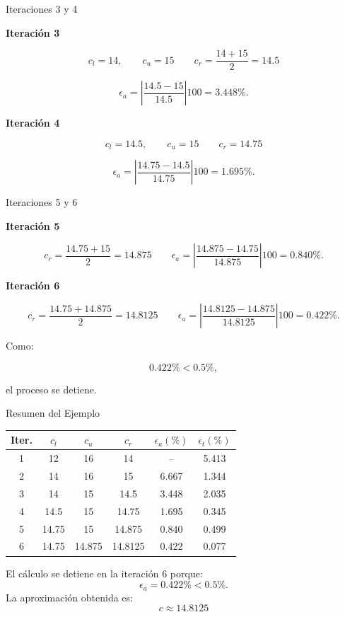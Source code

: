\documentclass[../../main.tex]{subfiles}
\begin{document}

\begin{frame}{Iteraciones 3 y 4}

\textbf{Iteración 3}

\[
c_l=14,
\qquad
c_u=15
\qquad
c_r=
\frac{14+15}{2}
=14.5
\]

\[
\epsilon_a
=
\left|
\frac{14.5-15}{14.5}
\right|
100
=
3.448\%.
\]

\textbf{Iteración 4}

\[
c_l=14.5,
\qquad
c_u=15
\qquad
c_r=
14.75
\]

\[
\epsilon_a
=
\left|
\frac{14.75-14.5}{14.75}
\right|
100
=
1.695\%.
\]

\end{frame}



\begin{frame}{Iteraciones 5 y 6}

\textbf{Iteración 5}

\[
c_r=
\frac{14.75+15}{2}
=
14.875
\qquad
\epsilon_a
=
\left|
\frac{14.875-14.75}{14.875}
\right|
100
=
0.840\%.
\]


\textbf{Iteración 6}

\[
c_r=
\frac{14.75+14.875}{2}
=
14.8125
\qquad
\epsilon_a
=
\left|
\frac{14.8125-14.875}{14.8125}
\right|
100
=
0.422\%.
\]

Como:

\[
0.422\%<0.5\%,
\]

el proceso se detiene.

\end{frame}



\begin{frame}{Resumen del Ejemplo}

\centering

\small

\begin{tabular}{|c|c|c|c|c|c|}
\hline
Iter. &
\(c_l\) &
\(c_u\) &
\(c_r\) &
\(\epsilon_a(\%)\) &
\(\epsilon_t(\%)\)
\\
\hline
1 & 12    & 16     & 14      & --    & 5.413 \\
2 & 14    & 16     & 15      & 6.667 & 1.344 \\
3 & 14    & 15     & 14.5    & 3.448 & 2.035 \\
4 & 14.5  & 15     & 14.75   & 1.695 & 0.345 \\
5 & 14.75 & 15     & 14.875  & 0.840 & 0.499 \\
6 & 14.75 & 14.875 & 14.8125 & 0.422 & 0.077 \\
\hline
\end{tabular}

El cálculo se detiene en la iteración 6 porque:
\[
\epsilon_a=0.422\%<0.5\%.
\]
La aproximación obtenida es:
\[
\boxed{
c\approx14.8125
}
\]
\end{frame}
\end{document}
